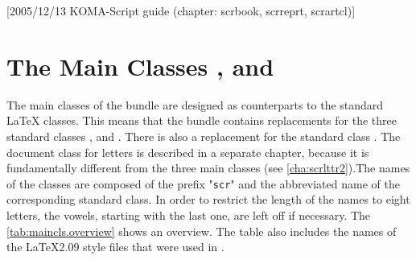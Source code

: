 %
%
%
%
%
%
%
%

[2005/12/13 KOMA-Script guide (chapter:
scrbook, scrreprt, scrartcl)]


\chapter{The Main Classes ,  and
  }

%

\begin{Explain}
  The main classes of the {\KOMAScript} bundle are designed as
  counterparts to the standard {\LaTeX} classes. This means that the
  {\KOMAScript} bundle contains replacements for the three standard
  classes ,
   and
  . There is also a replacement for
  the standard class . The
  document class for letters is described in a separate chapter,
  because it is fundamentally different from the three main classes
  (see \autoref{cha:scrlttr2}).The names of the {\KOMAScript}
  classes are composed of the prefix "\texttt{scr}" and the
  abbreviated name of the corresponding standard class. In order to
  restrict the length of the names to eight letters, the vowels,
  starting with the last one, are left off if necessary. The
  \autoref{tab:maincls.overview} shows an overview. The table also
  includes the names of the \LaTeX2.09 style files that were used in
  {\KOMAScript}.
\end{Explain}

